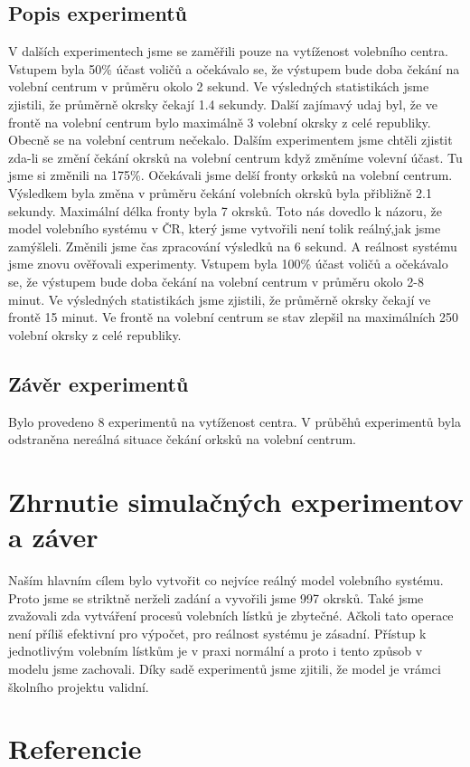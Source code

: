 \documentclass[12pt,a4paper,titlepage,final]{article}
\begin{document}
\subsection{Popis experimentů}
V dalších experimentech jsme se zaměřili pouze na vytíženost volebního centra. 
Vstupem byla 50\% účast voličů a očekávalo se, že výstupem bude doba čekání na volební centrum v průměru okolo 2 sekund. Ve výsledných statistikách jsme zjistili, že průměrně okrsky čekají 1.4 sekundy. Další zajímavý udaj byl, že ve frontě na volební centrum bylo maximálně 3 volební okrsky z celé republiky. Obecně se na volební centrum nečekalo. \newline
Dalším experimentem jsme chtěli zjistit zda-li se změní čekání okrsků na volební centrum když změníme volevní účast. Tu jsme si změnili na 175\%. Očekávali jsme delší fronty orksků na volební centrum. Výsledkem byla změna v průměru čekání volebních okrsků byla přibližně 2.1 sekundy. Maximální délka fronty byla 7 okrsků. \newline
Toto nás dovedlo k názoru, že model volebního systému v ČR, který jsme vytvořili není tolik reálný,jak jsme zamýšleli. Změnili jsme čas zpracování výsledků na 6 sekund. A reálnost systému jsme znovu ověřovali experimenty.\newline
Vstupem byla 100\% účast voličů a očekávalo se, že výstupem bude doba čekání na volební centrum v průměru okolo 2-8 minut. Ve výsledných statistikách jsme zjistili, že průměrně okrsky čekají ve frontě 15 minut. Ve frontě na volební centrum se stav zlepšil na maximálních 250 volební okrsky z celé republiky. 

\subsection{Závěr experimentů}
Bylo provedeno 8 experimentů na vytíženost centra. V průběhů experimentů byla odstraněna nereálná situace čekání orksků na volební centrum.


\section{Zhrnutie simulačných experimentov a záver}
Naším hlavním cílem bylo vytvořit co nejvíce reálný model volebního systému. Proto jsme se striktně nerželi zadání a vyvořili jsme 997 okrsků. Také jsme zvažovali zda vytváření procesů volebních lístků je zbytečné. Ačkoli tato operace není příliš efektivní pro výpočet, pro reálnost systému je zásadní. Přístup k jednotlivým volebním lístkům je v praxi normální a proto i tento způsob v modelu jsme zachovali.\newline
Díky sadě experimentů jsme zjitili, že model je vrámci školního projektu validní.




\newpage

\section{Referencie}





\newpage
\end{document}
